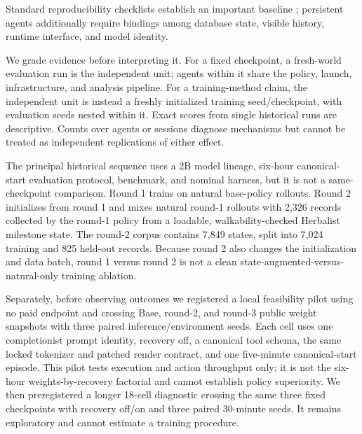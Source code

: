 \documentclass[11pt,a4paper]{article}
\begin{document}
Standard reproducibility checklists establish an important baseline
\citep{pineau2021reproducibility}; persistent agents additionally require
bindings among database state, visible history, runtime interface, and model
identity.

We grade evidence before interpreting it. For a fixed checkpoint, a fresh-world
evaluation run is the independent unit; agents within it share the policy,
launch, infrastructure, and analysis pipeline. For a training-method claim, the
independent unit is instead a freshly initialized training seed/checkpoint, with
evaluation seeds nested within it. Exact scores from single historical runs are
descriptive. Counts over agents or sessions diagnose mechanisms but cannot be
treated as independent replications of either effect.

The principal historical sequence uses a 2B model lineage, six-hour
canonical-start evaluation protocol, benchmark, and nominal harness, but it is
not a same-checkpoint comparison. Round 1 trains on natural base-policy rollouts.
Round 2 initializes from round 1 and mixes natural
round-1 rollouts with 2,326 records collected by the round-1 policy from a
loadable, walkability-checked Herbalist milestone state. The round-2 corpus contains 7,849 states,
split into 7,024 training and 825 held-out records. Because round 2 also changes
the initialization and data batch, round 1 versus round 2 is not a clean
state-augmented-versus-natural-only training ablation.

Separately, before observing outcomes we registered a local feasibility pilot
using no paid endpoint and crossing Base, round-2, and round-3 public weight snapshots
with three paired inference/environment seeds. Each cell uses one completionist
prompt identity, recovery off, a canonical tool schema, the same locked
tokenizer and patched render contract, and one five-minute canonical-start
episode. This pilot tests execution and action throughput only; it is not the
six-hour weights-by-recovery factorial and cannot establish policy superiority.
We then preregistered a longer 18-cell diagnostic crossing the same three fixed
checkpoints with recovery off/on and three paired 30-minute seeds. It remains
exploratory and cannot estimate a training procedure.
\end{document}
